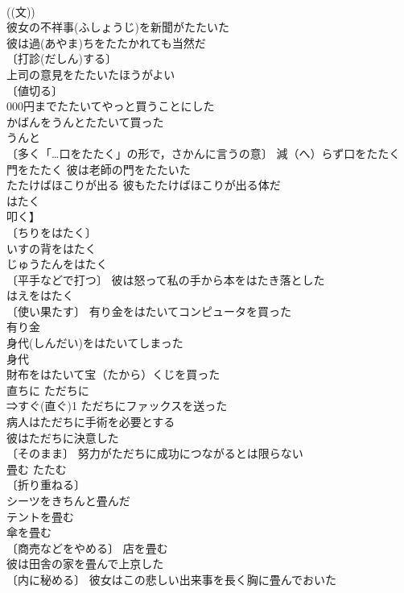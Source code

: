 \documentclass[8pt]{extreport}
\begin{document}
\begin{CJK}{UTF8}{min}
\\	((文)) 
\\	彼女の不祥事(ふしょうじ)を新聞がたたいた 
\\	彼は過(あやま)ちをたたかれても当然だ 
\\	〔打診(だしん)する〕　
\\	上司の意見をたたいたほうがよい 
\\	〔値切る〕
\\	000円までたたいてやっと買うことにした 
\\	かばんをうんとたたいて買った 
\\	うんと　
\\	〔多く「…口をたたく」の形で，さかんに言うの意〕 減（へ）らず口をたたく 
\\	門をたたく 彼は老師の門をたたいた 
\\	たたけばほこりが出る 彼もたたけばほこりが出る体だ 
\\	はたく
\\	叩く】 
\\	〔ちりをはたく〕
\\	いすの背をはたく 
\\	じゅうたんをはたく 
\\	〔平手などで打つ〕 彼は怒って私の手から本をはたき落とした 
\\	はえをはたく 
\\	〔使い果たす〕 有り金をはたいてコンピュータを買った 
\\	有り金　
\\	身代(しんだい)をはたいてしまった 
\\	身代　
\\	財布をはたいて宝（たから）くじを買った 
\\	直ちに	ただちに	
\\	⇒すぐ(直ぐ)1 ただちにファックスを送った 
\\	病人はただちに手術を必要とする 
\\	彼はただちに決意した 
\\	〔そのまま〕 努力がただちに成功につながるとは限らない 
\\	畳む	たたむ	
\\	〔折り重ねる〕
\\	シーツをきちんと畳んだ 
\\	テントを畳む 
\\	傘を畳む 
\\	〔商売などをやめる〕 店を畳む 
\\	彼は田舎の家を畳んで上京した 
\\	〔内に秘める〕 彼女はこの悲しい出来事を長く胸に畳んでおいた 

\end{CJK}
\end{document}

